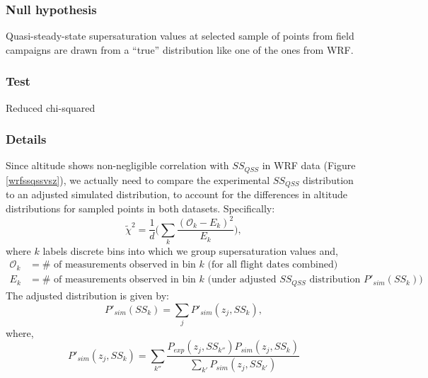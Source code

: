 \documentclass{article}
\begin{document}
\subsubsection{Null hypothesis}
Quasi-steady-state supersaturation values at selected sample of points from field campaigns are drawn from a ``true'' distribution like one of the ones from WRF. 
\subsubsection{Test}
Reduced chi-squared
\subsubsection{Details}
Since altitude shows non-negligible correlation with $SS_{QSS}$ in WRF data (Figure \ref{wrfssqssvsz}), we actually need to compare the experimental $SS_{QSS}$ distribution to an adjusted simulated distribution, to account for the differences in altitude distributions for sampled points in both datasets. Specifically:
\begin{equation}
\tilde\chi^2 = \frac{1}{d}\Big(\sum_{k} \frac{(\mathcal{O}_k - E_k)^2}{E_k}\Big),
\end{equation}
where $k$ labels discrete bins into which we group supersaturation values and,
\begin{align}
\mathcal{O}_k &= \text{# of measurements observed in bin $k$ (for all flight dates combined)}\nonumber\\
E_k &= \text{# of measurements observed in bin $k$ (under adjusted $SS_{QSS}$ distribution $P'_{sim}(SS_k)$)}\nonumber
\end{align}
The adjusted distribution is given by:
\begin{equation}
P'_{sim}(SS_k) = \sum_{j} P'_{sim}(z_j, SS_k),
\end{equation}
where,
\begin{equation}
P'_{sim}(z_j, SS_k) = \sum_{k''}\frac{P_{exp}(z_j, SS_{k''})P_{sim}(z_j, SS_k)}{\sum_{k'}P_{sim}(z_j, SS_{k'})}
\end{equation}
\end{document}

